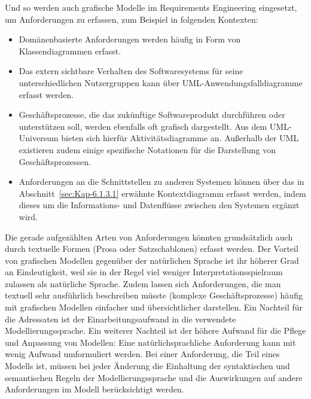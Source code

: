 Und so werden auch grafische Modelle im Requirements Engineering eingesetzt, um Anforderungen zu erfassen, zum Beispiel in folgenden Kontexten:

\begin{itemize}
	\item Domänenbasierte Anforderungen werden häufig in Form von Klassendiagrammen erfasst. 
	\item Das extern sichtbare Verhalten des Softwaresystems für seine unterschiedlichen Nutzergruppen kann über UML-Anwendungsfalldiagramme erfasst werden.
	\item Geschäftsprozesse, die das zukünftige Softwareprodukt durchführen oder unterstützen soll, werden ebenfalls oft grafisch dargestellt. Aus dem UML-
	\linebreak %
	Universum bieten sich hierfür Aktivitätsdiagramme an. Außerhalb der UML existieren zudem einige spezifische Notationen für die Darstellung von 
	\linebreak %
	Geschäfts\-prozessen.
	\item Anforderungen an die Schnittstellen zu anderen Systemen können über das in Abschnitt~\ref{sec:Kap-6.1.3.1} erwähnte Kontextdiagramm erfasst werden, indem dieses um die Informations- und Datenflüsse zwischen den Systemen ergänzt wird.
\end{itemize}

\vspace{1mm} %

Die gerade aufgezählten Arten von Anforderungen könnten grundsätzlich auch durch textuelle Formen (Prosa oder Satzschablonen) erfasst werden. Der Vorteil von grafischen Modellen gegenüber der natürlichen Sprache ist ihr höherer Grad an Eindeutigkeit, weil sie in der Regel viel weniger Interpretationsspielraum zulassen als natürliche Sprache. Zudem lassen sich Anforderungen, die man textuell sehr ausführlich beschreiben müsste (\zb komplexe Geschäftsprozesse) häufig mit grafischen Modellen einfacher und übersichtlicher darstellen. Ein Nachteil für die Adressaten ist der Einarbeitungsaufwand in die verwendete Modellierungssprache. Ein weiterer Nachteil ist der höhere Aufwand für die Pflege und Anpassung von Modellen: Eine natürlichsprachliche Anforderung kann mit wenig Aufwand umformuliert werden. Bei einer Anforderung, die Teil eines Modells ist, müssen bei jeder Änderung die Einhaltung der syntaktischen und semantischen Regeln der Modellierungssprache und die Auswirkungen auf andere Anforderungen im Modell berücksichtigt werden.

